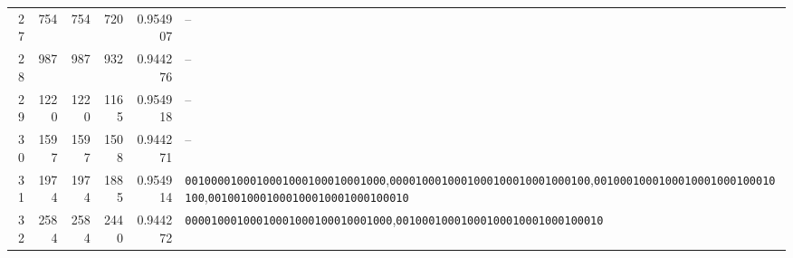 \begin{table}[H]
\begin{tabular}{r r r r r l}
27 & 754 & 754 & 720 & 0.954907 & --\\
28 & 987 & 987 & 932 & 0.944276 & --\\
29 & 1220 & 1220 & 1165 & 0.954918 & --\\
30 & 1597 & 1597 & 1508 & 0.944271 & --\\
31 & 1974 & 1974 & 1885 & 0.954914 & \texttt{0010000100010001000100010001000},\;\texttt{0000100010001000100010001000100},\;\texttt{0010001000100010001000100010100},\;\texttt{0010010001000100010001000100010}\\
32 & 2584 & 2584 & 2440 & 0.944272 & \texttt{00001000100010001000100010001000},\;\texttt{00100010001000100010001000100010}\\
\bottomrule
\end{tabular}
\end{table}

